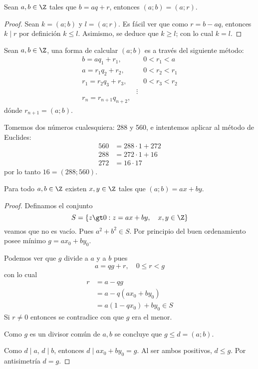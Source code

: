 \documentclass[11pt,oneside]{book}
\begin{document}
\begin{lem}
Sean $a,b\in\Z$ tales que $b=aq+r$, entonces $(a;b)=(a;r)$.
\end{lem}
\begin{proof}
Sean $k=(a;b)$ y $l=(a;r)$. Es fácil ver que como $r=b-aq$, entonces $k\mid r$ por definición $k\leq l$. Asimismo, se deduce que $k\geq l$; con lo cual $k=l$.
\end{proof}
\begin{thm}
Sean $a,b\in\Z$, una forma de calcular $(a;b)$ es a través del siguiente método:
\begin{align*}
b=aq_1+r_1,&\quad 0\lt r_1\lt a\\
a=r_1q_2+r_2,&\quad 0\lt r_2\lt r_1\\
r_1=r_2q_3+r_3,&\quad 0\lt r_3\lt r_2\\
&\vdots\\
r_n=r_{n+1}q_{n+2},
\end{align*}
dónde $r_{n+1}=(a;b)$.
\end{thm}
Tomemos dos números cualesquiera: 288 y 560, e intentemos aplicar al método de Euclides:
\begin{align*}
560&=288\cdot 1+272\\
288&=272\cdot 1+16\\
272&=16\cdot 17
\end{align*}
por lo tanto $16=(288;560)$.
\begin{thm}\label{thm:bezout-identity}
Para todo $a,b\in\Z$ existen $x,y\in\Z$ tales que $(a;b)=ax+by$.
\end{thm}
\begin{proof}
Definamos el conjunto
$$S=\{z\gt 0:z=ax+by,\quad x,y\in\Z\}$$
veamos que no es vacío. Pues $a^2+b^2\in S$. Por principio del buen ordenamiento posee mínimo $g=ax_0+by_0$.

Podemos ver que $g$ divide a $a$ y a $b$ pues
$$a=qg+r,\quad 0\leq r\lt g$$
con lo cual
\begin{align*}
r&=a-qg\\
&=a-q(ax_0+by_0)\\
&=a(1-qx_0)+by_0\in S
\end{align*}
Si $r\neq 0$ entonces se contradice con que $g$ era el menor.

Como $g$ es un divisor común de $a,b$ se concluye que $g\leq d=(a;b)$.

Como $d\mid a$, $d\mid b$, entonces $d\mid ax_0+by_0=g$. Al ser ambos positivos, $d\leq g$. Por antisimetría $d=g$.
\end{proof}
\end{document}
